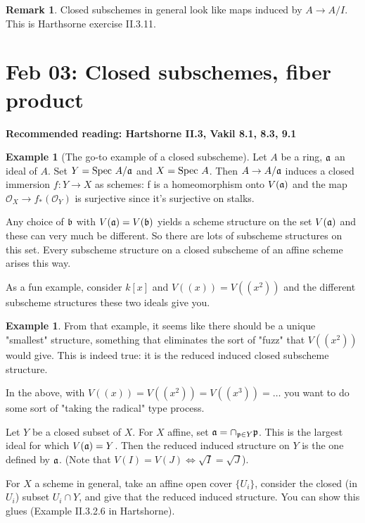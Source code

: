 \documentclass[10pt,reqno]{amsart}
\theoremstyle{definition}
\newtheorem{example}[theorem]{Example}
\newtheorem{remark}[theorem]{Remark}
\theoremstyle{remark}
\numberwithin{equation}{section}
\numberwithin{theorem}{section}
\newcommand{\OO}{{\mathcal O}}
\newcommand{\spec}{\textup{Spec }}
\newcommand{\fraka}{\frak{a}}
\newcommand{\frakb}{\frak{b}}
\newcommand{\pp}{\frak{p}}
\begin{document}
\begin{remark} Closed subschemes in general look like maps induced by $A \to A/I$. This is Harthsorne exercise II.3.11.
\end{remark}
\section{Feb 03: Closed subschemes, fiber product}
\textbf{Recommended reading:  Hartshorne II.3, Vakil 8.1, 8.3, 9.1}

\begin{example}[The go-to example of a closed subscheme] Let $A$ be a ring, $\fraka$ an ideal of $A$. Set $Y = \spec A/\fraka$ and $X = \spec A$. Then $A \to A/\fraka$ induces a closed immersion $f: Y \to X$ as schemes: f is a homeomorphism onto $V(\fraka)$ and the map $\OO_X \to f_*(\OO_Y)$ is surjective since it's surjective on stalks.

Any choice of $\frakb$ with $V(\fraka) = V(\frakb)$ yields a scheme structure on the set $V(\fraka)$ and these can very much be different. So there are lots of subscheme structures on this set. Every subscheme structure on a closed subscheme of an affine scheme arises this way.

As a fun example, consider $k[x]$ and $V((x)) = V((x^2))$ and the different subscheme structures these two ideals give you. 
\end{example}

\begin{example} From that example, it seems like there should be a unique "smallest" structure, something that eliminates the sort of "fuzz" that $V((x^2))$ would give. This is indeed true: it is the reduced induced closed subscheme structure.

In the above, with $V((x)) = V((x^2)) = V((x^3)) = \dots$ you want to do some sort of "taking the radical" type process.

Let $Y$ be a closed subset of $X$. For $X$ affine, set $\fraka = \cap_{\pp \in Y} \pp$. This is the largest ideal for which $V(\fraka)  = Y$. Then the reduced induced structure on $Y$ is the one defined by $\fraka$. (Note that $V(I) = V(J) \iff \sqrt{I} = \sqrt{J}$).

For $X$ a scheme in general, take an affine open cover $\{U_i\}$, consider the closed (in $U_i$) subset $U_i \cap Y$, and give that the reduced induced structure. You can show this glues (Example II.3.2.6 in Hartshorne).
\end{example}
\end{document}
